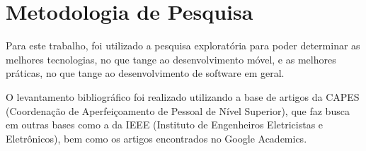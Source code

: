 \section{Metodologia de Pesquisa}

Para este trabalho, foi utilizado a pesquisa exploratória para poder determinar as melhores tecnologias, no que tange ao desenvolvimento móvel, e as melhores práticas, no que tange ao desenvolvimento de software em geral. 

O levantamento bibliográfico foi realizado utilizando a base de artigos da CAPES (Coordenação de Aperfeiçoamento de Pessoal de Nível Superior), que faz busca em outras bases como a da IEEE (Instituto de Engenheiros Eletricistas e Eletrônicos), bem como os artigos encontrados no Google Academics. 